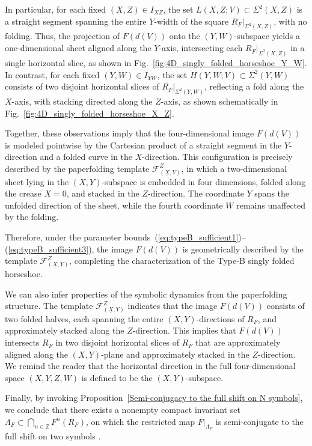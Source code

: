\documentclass[12pt]{iopart}
\begin{document}
In particular, for each fixed \( (X,Z) \in I_{XZ} \), the set \( L(X,Z;V) \subset \Sigma^2(X,Z) \) is a straight segment spanning the entire \( Y \)-width of the square \( R_F|_{\Sigma^2(X,Z)} \), with no folding. Thus, the projection of \( F(d(V)) \) onto the \( (Y,W) \)-subspace yields a one-dimensional sheet aligned along the \( Y \)-axis, intersecting each \( R_F|_{\Sigma^2(X,Z)} \) in a single horizontal slice, as shown in Fig.~\ref{fig:4D_singly_folded_horseshoe_Y_W}. In contrast, for each fixed \( (Y,W) \in I_{YW} \), the set \( H(Y,W;V) \subset \Sigma^2(Y,W) \) consists of two disjoint horizontal slices of \( R_F|_{\Sigma^2(Y,W)} \), reflecting a fold along the \( X \)-axis, with stacking directed along the \( Z \)-axis, as shown schematically in Fig.~\ref{fig:4D_singly_folded_horseshoe_X_Z}.

Together, these observations imply that the four-dimensional image \( F(d(V)) \) is modeled pointwise by the Cartesian product of a straight segment in the \( Y \)-direction and a folded curve in the \( X \)-direction. This configuration is precisely described by the paperfolding template \( \mathcal{F}^Z_{(\underline{X},Y)} \), in which a two-dimensional sheet lying in the \( (X,Y) \)-subspace is embedded in four dimensions, folded along the crease \( X = 0 \), and stacked in the \( Z \)-direction. The coordinate \( Y \) spans the unfolded direction of the sheet, while the fourth coordinate \( W \) remains unaffected by the folding.

Therefore, under the parameter bounds~(\ref{eq:typeB_sufficient1})--(\ref{eq:typeB_sufficient3}), the image \( F(d(V)) \) is geometrically described by the template \( \mathcal{F}^Z_{(\underline{X},Y)} \), completing the characterization of the Type‑B singly folded horseshoe.

We can also infer properties of the symbolic dynamics from the paperfolding structure. The template \( \mathcal{F}^Z_{(\underline{X},Y)} \) indicates that the image \( F(d(V)) \) consists of two folded halves, each spanning the entire \( (X,Y) \)-directions of \( R_F \), and approximately stacked along the \( Z \)-direction. This implies that \( F(d(V)) \) intersects \( R_F \) in two disjoint horizontal slices of \( R_F \) that are approximately aligned along the \( (X,Y) \)-plane and approximately stacked in the \( Z \)-direction. We remind the reader that the horizontal direction in the full four-dimensional space \( (X,Y,Z,W) \) is defined to be the \( (X,Y) \)-subspace.

Finally, by invoking Proposition~\ref{Semi-conjugacy to the full shift on N symbols}, we conclude that there exists a nonempty compact invariant set \( \Lambda_F \subset \bigcap_{n\in \mathbb{Z}} F^n(R_F) \), on which the restricted map \( F|_{\Lambda_F} \) is semi-conjugate to the full shift on two symbols \cite{Fujioka25}.
\end{document}
